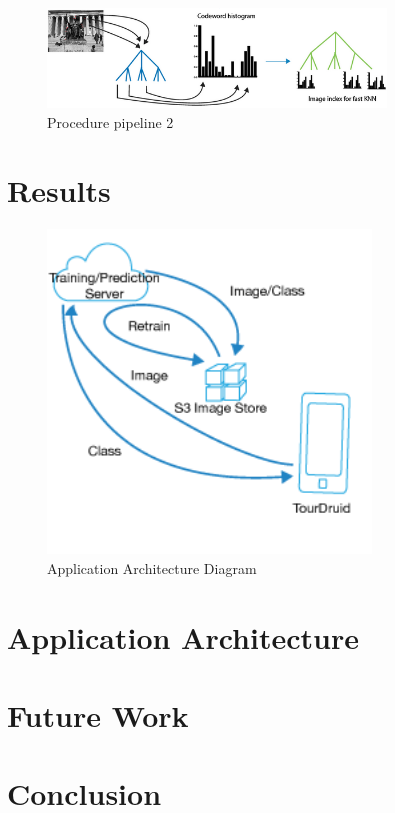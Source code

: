 \documentclass[twocolumn]{article}
\newcommand{\sectionfile}[3]{\section{#1} \label{sec:#2} }
\begin{document}
\begin{figure}
\includegraphics[width=90mm]{procedure2.png}
\caption{Procedure pipeline 2}
\label{overflow}

\end{figure}
\sectionfile{Results}{results}{results.tex}

\begin{figure}
\includegraphics[width=86mm]{app_arch.png}

\caption{Application Architecture Diagram}
\label{overflow}

\end{figure}
\sectionfile{Application Architecture}{application_architecture}{application_architecture.tex}
\sectionfile{Future Work}{future_work}{future.tex}
\sectionfile{Conclusion}{conclusion}{conclusion.tex}

\nocite{*}
{\small


}
\end{document}
